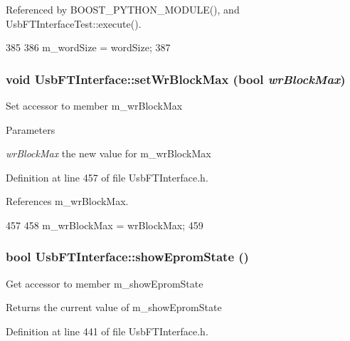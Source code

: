 Referenced by BOOST\_\-PYTHON\_\-MODULE(), and UsbFTInterfaceTest::execute().


\begin{DoxyCode}
385                                             {
386     m_wordSize = wordSize;
387   }
\end{DoxyCode}
\hypertarget{classUsbFTInterface_ab2e58c22979ffa60adf609eca2af78d3}{
\subsubsection[{setWrBlockMax}]{\setlength{\rightskip}{0pt plus 5cm}void UsbFTInterface::setWrBlockMax (bool {\em wrBlockMax})}}
\label{classUsbFTInterface_ab2e58c22979ffa60adf609eca2af78d3}
Set accessor to member m\_\-wrBlockMax 
\begin{DoxyParams}{Parameters}
\item[{\em wrBlockMax}]the new value for m\_\-wrBlockMax \end{DoxyParams}


Definition at line 457 of file UsbFTInterface.h.

References m\_\-wrBlockMax.


\begin{DoxyCode}
457                                        {
458     m_wrBlockMax = wrBlockMax;
459   }
\end{DoxyCode}
\hypertarget{classUsbFTInterface_a6e9b97244aaac289792fbef24daad33e}{
\subsubsection[{showEpromState}]{\setlength{\rightskip}{0pt plus 5cm}bool UsbFTInterface::showEpromState ()}}
\label{classUsbFTInterface_a6e9b97244aaac289792fbef24daad33e}
Get accessor to member m\_\-showEpromState \begin{DoxyReturn}{Returns}
the current value of m\_\-showEpromState 
\end{DoxyReturn}


Definition at line 441 of file UsbFTInterface.h.

